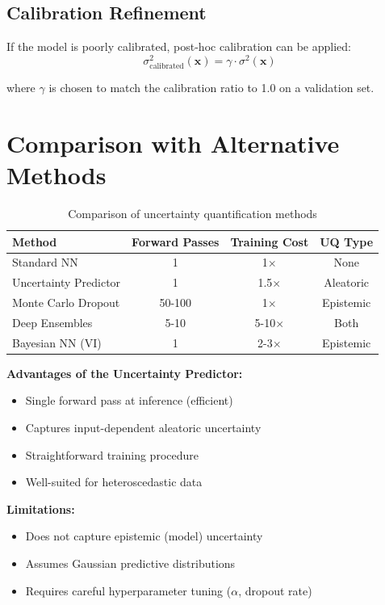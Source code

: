 \documentclass[11pt,a4paper]{article}
\begin{document}
\subsection{Calibration Refinement}

If the model is poorly calibrated, post-hoc calibration can be applied:
\begin{equation}
\sigma^2_{\text{calibrated}}(\mathbf{x}) = \gamma \cdot \sigma^2(\mathbf{x})
\end{equation}

where $\gamma$ is chosen to match the calibration ratio to 1.0 on a validation set.

\section{Comparison with Alternative Methods}

\begin{table}[h]
\centering
\begin{tabular}{lccc}
\toprule
\textbf{Method} & \textbf{Forward Passes} & \textbf{Training Cost} & \textbf{UQ Type} \\
\midrule
Standard NN & 1 & 1$\times$ & None \\
Uncertainty Predictor & 1 & 1.5$\times$ & Aleatoric \\
Monte Carlo Dropout & 50-100 & 1$\times$ & Epistemic \\
Deep Ensembles & 5-10 & 5-10$\times$ & Both \\
Bayesian NN (VI) & 1 & 2-3$\times$ & Epistemic \\
\bottomrule
\end{tabular}
\caption{Comparison of uncertainty quantification methods}
\end{table}

\textbf{Advantages of the Uncertainty Predictor:}
\begin{itemize}
    \item Single forward pass at inference (efficient)
    \item Captures input-dependent aleatoric uncertainty
    \item Straightforward training procedure
    \item Well-suited for heteroscedastic data
\end{itemize}

\textbf{Limitations:}
\begin{itemize}
    \item Does not capture epistemic (model) uncertainty
    \item Assumes Gaussian predictive distributions
    \item Requires careful hyperparameter tuning ($\alpha$, dropout rate)
\end{itemize}
\end{document}
